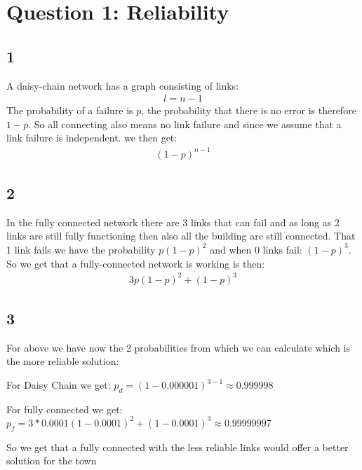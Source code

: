 \section{Question 1: Reliability}
\subsection{1}
A daisy-chain network has a graph consisting of links:
\begin{align}
l = n - 1 	
\end{align}
The probability of a failure is $p$, the probability that there is no error is therefore $1 - p$.
So all connecting also means no link failure and since we assume that a link failure is independent. we then get:
\begin{align}
	(1-p)^{n-1}
\end{align}

\subsection{2}
In the fully connected network there are 3 links that can fail and as long as 2 links are still fully functioning then also all the building are still connected.
That 1 link fails we have the probability $p(1-p)^2$ and when 0 links fail: $(1-p)^3$.
So we get that a fully-connected network is working is then:
\begin{align}
	3p(1-p)^2+(1-p)^3
\end{align}
\subsection{3}
For above we have now the 2 probabilities from which we can calculate which is the more reliable solution:

For Daisy Chain we get: $p_{d} = (1-0.000001)^{3-1} \approx 0.999998 $

For fully connected we get: $p_{f} = 3*0.0001(1-0.0001)^2+(1-0.0001)^3 \approx 0.99999997$

So we get that a fully connected with the less reliable links would offer a better solution for the town